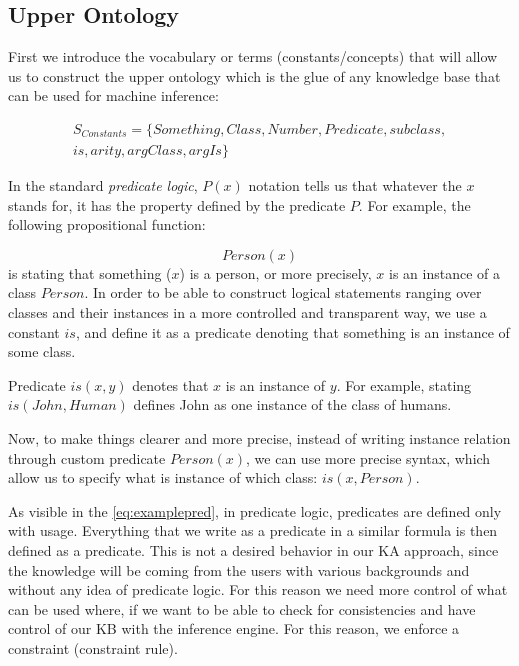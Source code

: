 \subsection{Upper Ontology}
\label{section:upperOnto}
First we introduce the vocabulary or terms (constants/concepts) that will allow 
us to construct the upper ontology which is the glue of any knowledge base that 
can be used for machine inference:

\begin{equation}\label{set:terms}
\begin{gathered}
S_{Constants} = \{Something, Class, Number, Predicate, subclass, \\
	is, arity, argClass, argIs\}
\end{gathered}
\end{equation}

In the standard \emph{predicate logic}, $P(x)$ notation tells us that whatever 
the $x$ stands for, it has the property defined by the predicate $P$. 
For example, the following propositional function:

\begin{equation}\label{eq:examplepred}
Person(x)
\end{equation}
is stating that something ($x$) is a person, or more precisely, $x$ is an 
instance of a class $Person$. In order to be able to construct logical 
statements ranging
over classes and their instances in a more controlled and transparent way, we
use a constant $is$, and define it as a predicate denoting that something is an
instance of some class.

\begin{definition}[predicate "$is$"]
\label{const:is}
Predicate $is(x,y)$ denotes that $x$ is an instance of $y$. For example, 
stating $is(John, Human)$ defines John as one instance of the class of humans.
\end{definition}
Now, to make things clearer and more precise, instead of writing instance
relation through custom predicate $Person(x)$, we can use more precise syntax, 
which allow us to specify what is instance of which class: $is(x,Person)$.

As visible in the \autoref{eq:examplepred}, in predicate logic, predicates are
defined only with usage. Everything that we write as a predicate in a similar
formula is then defined as a predicate. This is not a desired behavior in our 
KA approach, since the knowledge will be coming from the users with various
backgrounds and without any idea of predicate logic. For this reason we
need more control of what can be used where, if we want to be able to
check for consistencies and have control of our KB with the inference engine.
For this reason, we enforce a constraint (constraint rule).

